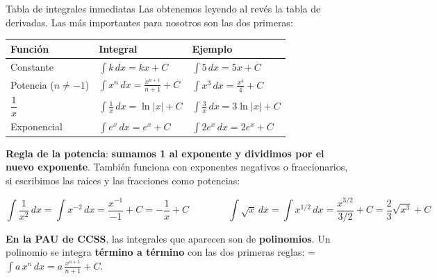 \documentclass[11pt,a4paper]{article}
\newcommand{\fmm}[1]{\setbox0=\hbox{$#1$}\ifdim\wd0>\linewidth\[#1\]\else\mbox{\box0}\fi}
\newcommand{\fmuline}[1]{\textbf{\color{fmaccent}#1}}
\begin{document}
  
\begin{fmdef}{Tabla de integrales inmediatas}
Las obtenemos leyendo al revés la tabla de derivadas. Las más importantes para nosotros son las dos primeras:

      
\begin{center}\renewcommand{\arraystretch}{2.3}\small\begin{tabularx}{\linewidth}{>{\raggedright\arraybackslash}p{3.2cm}>{\centering\arraybackslash}X>{\centering\arraybackslash}X}\toprule
\textbf{Función} & \textbf{Integral} & \textbf{Ejemplo}\\\midrule
Constante & $\displaystyle\int k\,dx=kx+C$ & $\displaystyle\int 5\,dx=5x+C$\\[3pt]
Potencia ($n\neq-1$) & $\displaystyle\int x^n\,dx=\frac{x^{n+1}}{n+1}+C$ & $\displaystyle\int x^3\,dx=\frac{x^4}{4}+C$\\[3pt]
$\dfrac1x$ & $\displaystyle\int \frac1x\,dx=\ln|x|+C$ & $\displaystyle\int \frac3x\,dx=3\ln|x|+C$\\[3pt]
Exponencial & $\displaystyle\int e^x\,dx=e^x+C$ & $\displaystyle\int 2e^x\,dx=2e^x+C$\\[3pt]
\bottomrule\end{tabularx}\end{center}

      

\fmuline{Regla de la potencia}: \textbf{sumamos 1 al exponente y dividimos por el nuevo exponente}. También funciona con exponentes negativos o fraccionarios, si escribimos las raíces y las fracciones como potencias:

      
\[\int\frac{1}{x^2}\,dx=\int x^{-2}\,dx=\frac{x^{-1}}{-1}+C=-\frac1x+C\qquad\qquad\int\sqrt x\,dx=\int x^{1/2}\,dx=\frac{x^{3/2}}{3/2}+C=\frac{2}{3}\sqrt{x^3}+C\]

      
\begin{fmnote}\fmuline{En la PAU de CCSS}, las integrales que aparecen son de \textbf{polinomios}. Un polinomio se integra \textbf{término a término} con las dos primeras reglas: \fmm{\displaystyle\int a\,x^n\,dx=a\,\frac{x^{n+1}}{n+1}+C}.\end{fmnote}
\end{fmdef}
\end{document}
